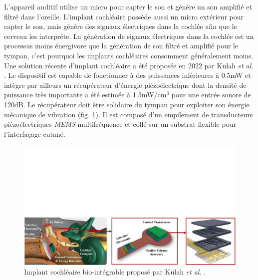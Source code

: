 L'appareil auditif utilise un micro pour capter le son et génère un son amplifié et filtré dans l'oreille. L'implant cochléaire possède aussi un micro extérieur pour capter le son, mais génère des signaux électriques dans la cochlée afin que le cerveau les interprète. La génération de signaux électriques dans la cochlée est un processus moins énergivore que la génération de son filtré et amplifié pour le tympan, c'est pourquoi les implants cochléaires consomment généralement moins. Une solution récente d'implant cochléaire a été proposée en 2022 par Kulah \emph{et al.} \cite{Kulah2022}. Le dispositif est capable de fonctionner à des puissances inférieures à 0.5mW et intègre par ailleurs un récupérateur d'énergie piézoélectrique dont la densité de puissance très importante a été estimée à 1.5mW/cm$^3$ pour une entrée sonore de 120dB. Le récupérateur doit être solidaire du tympan pour exploiter son énergie mécanique de vibration (fig. \ref{fig:cochleaire_MEMS}). Il est composé d'un empilement de transducteurs piézoélectriques \emph{MEMS} multifréquence et collé sur un substrat flexible pour l'interfaçage cutané.
\begin{figure}[!htbp]
	\begin{center}
		\captionsetup{justification=centering}
		\includegraphics[trim={0cm 0cm 0cm 11.5cm},clip, width=\textwidth]{../Chap1/Figure/cochleaire_MEMS.pdf}
		\caption{Implant cochléaire bio-intégrable proposé par Kulah \emph{et al.} \cite{Kulah2022}.}
		\label{fig:cochleaire_MEMS}
	\end{center}
\end{figure}

